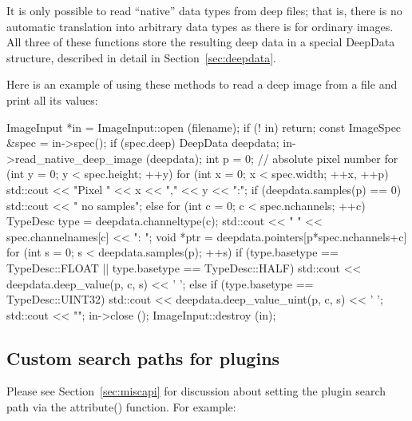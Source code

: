 It is only possible to read ``native'' data types from deep files; that
is, there is no automatic translation into arbitrary data types as there
is for ordinary images.  All three of these functions store the
resulting deep data in a special {\cf DeepData} structure, described in
detail in Section~\ref{sec:deepdata}.

Here is an example of using these methods to read a deep image from 
a file and print all its values:

\begin{code}
    ImageInput *in = ImageInput::open (filename);
    if (! in)
        return;
    const ImageSpec &spec = in->spec();
    if (spec.deep) {
        DeepData deepdata;
        in->read_native_deep_image (deepdata);
        int p = 0;  // absolute pixel number
        for (int y = 0; y < spec.height;  ++y) {
            for (int x = 0;  x < spec.width;  ++x, ++p) {
                std::cout << "Pixel " << x << "," << y << ":\n";
                if (deepdata.samples(p) == 0)
                    std::cout << "  no samples\n";
                else
                    for (int c = 0;  c < spec.nchannels;  ++c) {
                        TypeDesc type = deepdata.channeltype(c);
                        std::cout << "  " << spec.channelnames[c] << ": ";
                        void *ptr = deepdata.pointers[p*spec.nchannels+c]
                        for (int s = 0; s < deepdata.samples(p); ++s) {
                            if (type.basetype == TypeDesc::FLOAT ||
                                type.basetype == TypeDesc::HALF)
                                std::cout << deepdata.deep_value(p, c, s) << ' ';
                            else if (type.basetype == TypeDesc::UINT32)
                                std::cout << deepdata.deep_value_uint(p, c, s) << ' ';
                        }
                        std::cout << "\n";
                    }
            }
        }
    }
    in->close ();
    ImageInput::destroy (in);
\end{code}


\subsection{Custom search paths for plugins}
\label{sec:imageinput:searchpaths}

Please see Section~\ref{sec:miscapi} for discussion
about setting the plugin search path via the {\cf attribute()} function.
For example:




